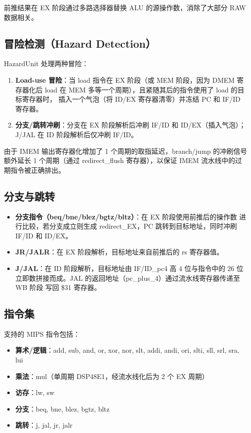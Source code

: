 \documentclass[12pt,a4paper]{ctexart}
\begin{document}
前推结果在 EX 阶段通过多路选择器替换 ALU 的源操作数，消除了大部分 RAW 数据相关。

\subsection{冒险检测（Hazard Detection）}

HazardUnit 处理两种冒险：
\begin{enumerate}[nosep]
  \item \textbf{Load-use 冒险}：当 load 指令在 EX 阶段（或 MEM 阶段，因为 DMEM
  寄存器化后 load 在 MEM 多等一个周期），且紧随其后的指令使用了 load 的目标寄存器时，
  插入一个气泡（将 ID/EX 寄存器清零）并冻结 PC 和 IF/ID 寄存器。
  \item \textbf{分支/跳转冲刷}：分支在 EX 阶段解析后冲刷 IF/ID 和
  ID/EX（插入气泡）；J/JAL 在 ID 阶段解析后仅冲刷 IF/ID。
\end{enumerate}

由于 IMEM 输出寄存器化增加了 1 个周期的取指延迟，branch/jump 的冲刷信号额外延长
1 个周期（通过 redirect\_flush 寄存器），以保证 IMEM 流水线中的过期指令被正确排出。

\subsection{分支与跳转}

\begin{itemize}[nosep]
  \item \textbf{分支指令（beq/bne/blez/bgtz/bltz）}：在 EX 阶段使用前推后的操作数
  进行比较，若分支成立则生成 redirect\_EX，PC 跳转到目标地址，同时冲刷 IF/ID 和 ID/EX。
  \item \textbf{JR/JALR}：在 EX 阶段解析，目标地址来自前推后的 rs 寄存器值。
  \item \textbf{J/JAL}：在 ID 阶段解析，目标地址由 IF/ID\_pc4 高 4 位与指令中的
  26 位立即数拼接而成。JAL 的返回地址（pc\_plus\_4）通过流水线寄存器传递至 WB 阶段
  写回 \$31 寄存器。
\end{itemize}

\subsection{指令集}

支持的 MIPS 指令包括：
\begin{itemize}[nosep]
  \item \textbf{算术/逻辑}：add, sub, and, or, xor, nor, slt, addi, andi, ori,
  slti, sll, srl, sra, lui
  \item \textbf{乘法}：mul（单周期 DSP48E1，经流水线化后为 2 个 EX 周期）
  \item \textbf{访存}：lw, sw
  \item \textbf{分支}：beq, bne, blez, bgtz, bltz
  \item \textbf{跳转}：j, jal, jr, jalr
\end{itemize}
\end{document}
